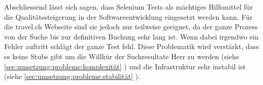 Abschliessend lässt sich sagen, dass Selenium Tests als mächtiges Hilfsmittel für die Qualitätssteigerung in der Softwareentwicklung eingesetzt werden kann. Für die travel.ch Webseite sind sie jedoch nur teilweise geeignet, da der ganze Prozess von der Suche bis zur definitiven Buchung sehr lang ist. Wenn dabei irgendwo ein Fehler auftritt schlägt der ganze Test fehl. Diese Problematik wird verstärkt, dass es keine Stubs gibt um die Willkür der Suchresultate Herr zu werden (siehe \cref{sec:umsetzung:probleme:komplexität} ) und die Infrastruktur sehr instabil ist (siehe \cref{sec:umsetzung:probleme:stabilität} ).